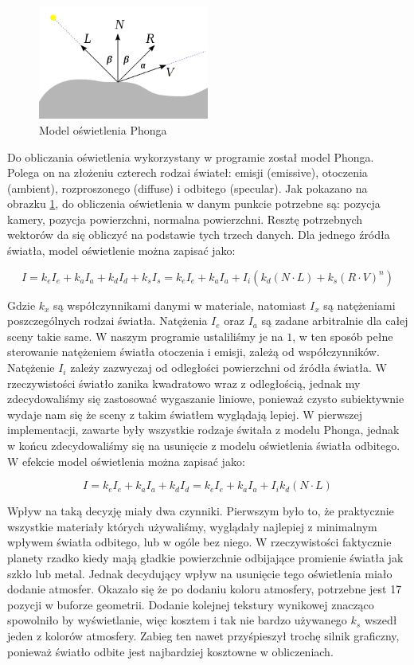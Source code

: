 \begin{figure}
\centering
	\includegraphics[width=0.5\textwidth]{img/phong.png}
\caption{Model oświetlenia Phonga}
\label{fig:phong}
\end{figure}

Do obliczania oświetlenia wykorzystany w programie został model Phonga. Polega on na złożeniu czterech rodzai świateł: emisji (emissive), otoczenia (ambient), rozproszonego (diffuse) i odbitego (specular). Jak pokazano na obrazku \hyperref[fig:phong]{\ref*{fig:phong}}, do obliczenia oświetlenia w danym punkcie potrzebne są: pozycja kamery, pozycja powierzchni, normalna powierzchni. Resztę potrzebnych wektorów da się obliczyć na podstawie tych trzech danych. Dla jednego źródła światła, model oświetlenie można zapisać jako:


$$ I = k_e I_e + k_a I_a + k_d I_d + k_s I_s = k_e I_e + k_a I_a + I_i( k_d( N \cdot L ) + k_s ( R \cdot V )^n ) $$

Gdzie $k_x$ są współczynnikami danymi w materiale, natomiast $I_x$ są natężeniami poszczególnych rodzai światła. Natężenia $I_e$ oraz $I_a$ są zadane arbitralnie dla całej sceny takie same. W naszym programie ustaliliśmy je na $1$, w ten sposób pełne sterowanie natężeniem światła otoczenia i emisji, zależą od współczynników. Natężenie $I_i$ zależy zazwyczaj od odległości powierzchni od źródła światła. W rzeczywistości światło zanika kwadratowo wraz z odległością, jednak my zdecydowaliśmy się zastosować wygaszanie liniowe, ponieważ czysto subiektywnie wydaje nam się że sceny z takim światłem wyglądają lepiej. W pierwszej implementacji, zawarte były wszystkie rodzaje świtała z modelu Phonga, jednak w końcu zdecydowaliśmy się na usunięcie z modelu oświetlenia światła odbitego. W efekcie model oświetlenia można zapisać jako:

$$ I = k_e I_e + k_a I_a + k_d I_d = k_e I_e + k_a I_a + I_i k_d( N \cdot L ) $$

Wpływ na taką decyzję miały dwa czynniki. Pierwszym było to, że praktycznie wszystkie materiały których używaliśmy, wyglądały najlepiej z minimalnym wpływem światła odbitego, lub w ogóle bez niego. W rzeczywistości faktycznie planety rzadko kiedy mają gładkie powierzchnie odbijające promienie światła jak szkło lub metal. Jednak decydujący wpływ na usunięcie tego oświetlenia miało dodanie atmosfer. Okazało się że po dodaniu koloru atmosfery, potrzebne jest 17 pozycji w buforze geometrii. Dodanie kolejnej tekstury wynikowej znacząco spowolniło by wyświetlanie, więc kosztem i tak nie bardzo używanego $k_s$ wszedł jeden z kolorów atmosfery. Zabieg ten nawet przyśpieszył trochę silnik graficzny, ponieważ światło odbite jest najbardziej kosztowne w obliczeniach.

